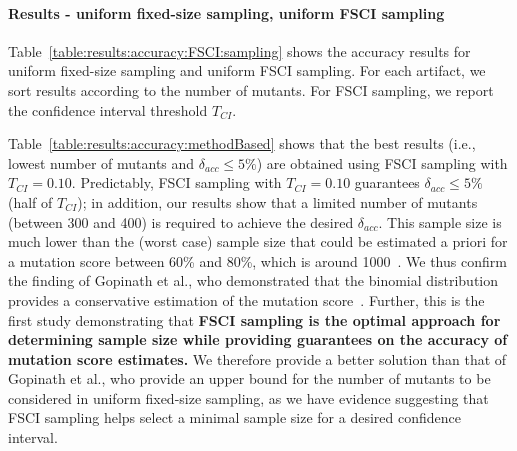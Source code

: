 \paragraph{Results - uniform fixed-size sampling, uniform FSCI sampling}



Table~\ref{table:results:accuracy:FSCI:sampling} shows the accuracy results for uniform fixed-size sampling and uniform FSCI sampling. For each artifact, we sort results according to the number of mutants. For FSCI sampling, we report the confidence interval threshold $T_\mathit{CI}$. 

Table~\ref{table:results:accuracy:methodBased}  shows that the best results (i.e., lowest number of mutants and $\delta_{acc} \le 5\%$) are obtained using  FSCI sampling with $T_\mathit{CI}=0.10$. Predictably, FSCI sampling with $T_\mathit{CI}=0.10$ guarantees $\delta_{acc} \le 5\%$ (half of $T_\mathit{CI}$); in addition, our results show that a limited number of mutants (between 300 and 400) is required to achieve the desired $\delta_{acc}$. This sample size is much lower than the (worst case) sample size that could be estimated a priori for a mutation score between 60\% and 80\%, which is around 1000~\cite{Goncalves2012}. We thus confirm the finding of Gopinath et al., who demonstrated that the binomial distribution provides a conservative estimation of the mutation score~\cite{gopinath2015hard}.
Further, this is the first study demonstrating that \textbf{FSCI sampling is the optimal approach for determining sample size while providing guarantees on the accuracy of mutation score estimates.} 
We therefore provide a better solution than that of Gopinath et al., who provide an upper bound for the number of mutants to be considered in uniform fixed-size sampling, as we have evidence suggesting that FSCI sampling helps select a minimal sample size for a desired confidence interval.





%
%




